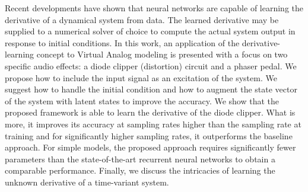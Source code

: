 Recent developments have shown that neural networks are capable of learning the derivative of a dynamical system from data. The learned derivative may be supplied to a numerical solver of choice to compute the actual system output in response to initial conditions. In this work, an application of the derivative-learning concept to Virtual Analog modeling is presented with a focus on two specific audio effects: a diode clipper (distortion) circuit and a phaser pedal. We propose how to include the input signal as an excitation of the system. We suggest how to handle the initial condition and how to augment the state vector of the system with latent states to improve the accuracy. We show that the proposed framework is able to learn the derivative of the diode clipper. What is more, it improves its accuracy at sampling rates higher than the sampling rate at training and for significantly higher sampling rates, it outperforms the baseline approach. For simple models, the proposed approach requires significantly fewer parameters than the state-of-the-art recurrent neural networks to obtain a comparable performance. Finally, we discuss the intricacies of learning the unknown derivative of a time-variant system.
